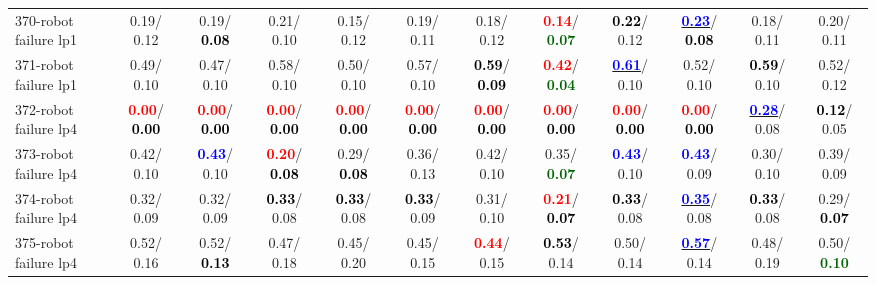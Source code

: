 \begin{table}[h]
\begin{center}
{\begin{tabular}{lc|c|c|c|c|c|c|c|c|c|c}
370-robot failure lp1 &   0.19/  0.12 &   0.19/\textcolor{black}{\textbf{  0.08}} &   0.21/  0.10 &   0.15/  0.12 &   0.19/  0.11 &   0.18/  0.12 & \textcolor{red}{\textbf{  0.14}}/\textcolor{darkgreen}{\textbf{  0.07}} & \textcolor{black}{\textbf{  0.22}}/  0.12 & \underline{\textcolor{blue}{\textbf{  0.23}}}/\textcolor{black}{\textbf{  0.08}} &   0.18/  0.11 &   0.20/  0.11 \\
371-robot failure lp1 &   0.49/  0.10 &   0.47/  0.10 &   0.58/  0.10 &   0.50/  0.10 &   0.57/  0.10 & \textcolor{black}{\textbf{  0.59}}/\textcolor{black}{\textbf{  0.09}} & \textcolor{red}{\textbf{  0.42}}/\textcolor{darkgreen}{\textbf{  0.04}} & \underline{\textcolor{blue}{\textbf{  0.61}}}/  0.10 &   0.52/  0.10 & \textcolor{black}{\textbf{  0.59}}/  0.10 &   0.52/  0.12 \\
372-robot failure lp4 & \textcolor{red}{\textbf{  0.00}}/\textcolor{black}{\textbf{  0.00}} & \textcolor{red}{\textbf{  0.00}}/\textcolor{black}{\textbf{  0.00}} & \textcolor{red}{\textbf{  0.00}}/\textcolor{black}{\textbf{  0.00}} & \textcolor{red}{\textbf{  0.00}}/\textcolor{black}{\textbf{  0.00}} & \textcolor{red}{\textbf{  0.00}}/\textcolor{black}{\textbf{  0.00}} & \textcolor{red}{\textbf{  0.00}}/\textcolor{black}{\textbf{  0.00}} & \textcolor{red}{\textbf{  0.00}}/\textcolor{black}{\textbf{  0.00}} & \textcolor{red}{\textbf{  0.00}}/\textcolor{black}{\textbf{  0.00}} & \textcolor{red}{\textbf{  0.00}}/\textcolor{black}{\textbf{  0.00}} & \underline{\textcolor{blue}{\textbf{  0.28}}}/  0.08 & \textcolor{black}{\textbf{  0.12}}/  0.05 \\
373-robot failure lp4 &   0.42/  0.10 & \textcolor{blue}{\textbf{  0.43}}/  0.10 & \textcolor{red}{\textbf{  0.20}}/\textcolor{black}{\textbf{  0.08}} &   0.29/\textcolor{black}{\textbf{  0.08}} &   0.36/  0.13 &   0.42/  0.10 &   0.35/\textcolor{darkgreen}{\textbf{  0.07}} & \textcolor{blue}{\textbf{  0.43}}/  0.10 & \textcolor{blue}{\textbf{  0.43}}/  0.09 &   0.30/  0.10 &   0.39/  0.09 \\ \hline
374-robot failure lp4 &   0.32/  0.09 &   0.32/  0.09 & \textcolor{black}{\textbf{  0.33}}/  0.08 & \textcolor{black}{\textbf{  0.33}}/  0.08 & \textcolor{black}{\textbf{  0.33}}/  0.09 &   0.31/  0.10 & \textcolor{red}{\textbf{  0.21}}/\textcolor{black}{\textbf{  0.07}} & \textcolor{black}{\textbf{  0.33}}/  0.08 & \underline{\textcolor{blue}{\textbf{  0.35}}}/  0.08 & \textcolor{black}{\textbf{  0.33}}/  0.08 &   0.29/\textcolor{black}{\textbf{  0.07}} \\
375-robot failure lp4 &   0.52/  0.16 &   0.52/\textcolor{black}{\textbf{  0.13}} &   0.47/  0.18 &   0.45/  0.20 &   0.45/  0.15 & \textcolor{red}{\textbf{  0.44}}/  0.15 & \textcolor{black}{\textbf{  0.53}}/  0.14 &   0.50/  0.14 & \underline{\textcolor{blue}{\textbf{  0.57}}}/  0.14 &   0.48/  0.19 &   0.50/\textcolor{darkgreen}{\textbf{  0.10}} \\

\end{tabular}}
\end{center}
\end{table}

